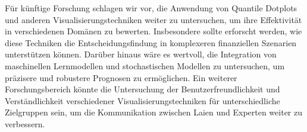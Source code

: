 Für künftige Forschung schlagen wir vor, die Anwendung von Quantile Dotplots und anderen Visualisierungstechniken weiter zu untersuchen, um ihre Effektivität in verschiedenen Domänen zu bewerten. Insbesondere sollte erforscht werden, wie diese Techniken die Entscheidungsfindung in komplexeren finanziellen Szenarien unterstützen können. Darüber hinaus wäre es wertvoll, die Integration von maschinellen Lernmodellen und stochastischen Modellen zu untersuchen, um präzisere und robustere Prognosen zu ermöglichen. Ein weiterer Forschungsbereich könnte die Untersuchung der Benutzerfreundlichkeit und Verständlichkeit verschiedener Visualisierungstechniken für unterschiedliche Zielgruppen sein, um die Kommunikation zwischen Laien und Experten weiter zu verbessern.
